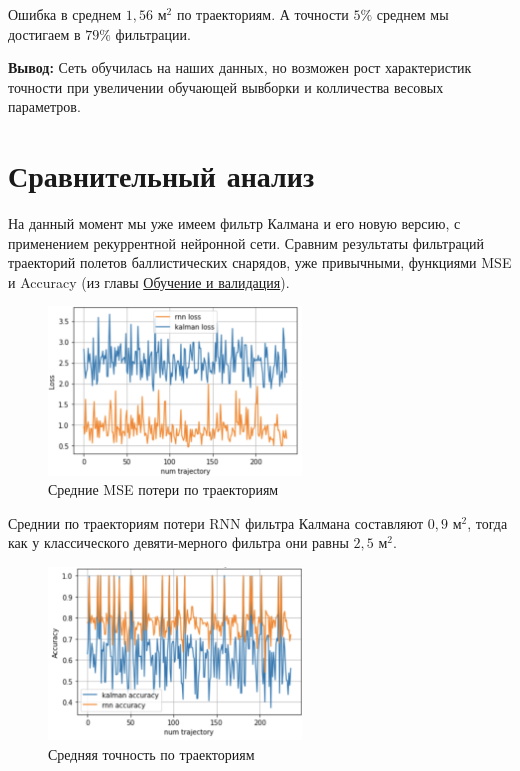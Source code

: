 \documentclass[a4paper,11pt]{article} %
\begin{document}
Ошибка в среднем $1,56$ м$^2$ по траекториям.  А точности $5\%$ среднем мы достигаем в $79\%$  фильтрации.

\textbf{Вывод:} Сеть обучилась на наших данных, но возможен рост характеристик точности при  увеличении  обучающей вывборки и колличества весовых параметров.
 
\newpage
\section{Сравнительный анализ}
На данный момент мы  уже имеем фильтр Калмана и его новую версию, с применением  рекуррентной  нейронной сети.  Сравним результаты фильтраций траекторий полетов баллистических снарядов, уже привычными,  функциями MSE и Accuracy (из главы \hyperref[trainval]{Обучение  и валидация}).

\begin{figure}[h!]
\begin{center}
\includegraphics[width=0.6\textwidth]{images/battle1.png}
\end{center}
\caption{Средние MSE потери по траекториям} \label{battle1}
\end{figure}

Среднии по траекториям потери RNN фильтра Калмана составляют $0,9$ м$^2$,  тогда как у классического девяти-мерного фильтра они равны $2,5$ м$^2$.

\begin{figure}[h!]
\begin{center}
\includegraphics[width=0.6\textwidth]{images/battle2.png}
\end{center}
\caption{Средняя точность по траекториям} \label{battle2}
\end{figure}
\end{document}
